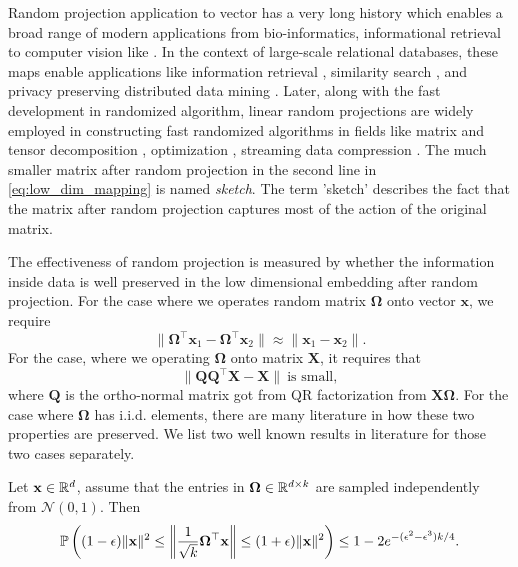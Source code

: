 Random projection application to vector has a very long history which enables a broad range of modern applications from bio-informatics, informational retrieval to computer vision like \citep{wright2009robust,buhler2002finding,allen2014sparse,bingham2001random,fradkin2003experiments, halko2011finding, wang2012semi, jegou2008hamming}. In the context of large-scale relational databases, these maps enable
applications like information retrieval \citep{papadimitriou2000latent},
similarity search \citep{sahin2005prism,kaski1998dimensionality},
and privacy preserving distributed data mining \citep{liu2006random}. 
Later, along with the fast development in randomized algorithm, linear random projections are widely employed in constructing fast randomized algorithms in fields like matrix and tensor decomposition \citep{woolfe2008fast, tropp2017practical}, optimization \citep{yurtsever2017sketchy}, streaming data compression \citep{Tropp2019-SketchingScientificSimulation, sun2019low}. The much smaller matrix after random projection in the second line in \eqref{eq:low_dim_mapping} is named \emph{sketch}.  
The term 'sketch' describes the fact that the matrix after random projection captures most of the action of the original matrix.  \par 
The effectiveness of random projection is measured by whether the information inside data is well preserved in the low dimensional embedding after random projection. For the case where we operates random matrix $\mathbf{\Omega}$ onto vector $\mathbf{x}$, we require 
\begin{equation}
\|\mathbf{\Omega}^\top\mathbf{x}_1 - \mathbf{\Omega}^\top\mathbf{x}_2\| \approx 
\|\mathbf{x}_1 -\mathbf{x}_2\|.
\end{equation}
For the case, where we operating $\mathbf{\Omega}$ onto matrix $\mathbf{X}$, it requires that
\begin{equation}
\|\mathbf{QQ}^\top \mathbf{X} - \mathbf{X}\| ~ \text{is small}, 
\end{equation}
where $\mathbf{Q}$ is the ortho-normal matrix got from QR factorization from $\mathbf{X\Omega}$.
For the case where $\mathbf{\Omega}$ has i.i.d. elements, there are many literature in how these two properties are preserved. We list two well known results in literature for those two cases separately.  
\begin{lem}
	\label{lem:gauss-rp-vector}
	Let $\mathbf{x} \in \mathbb{R}^d$, assume that the entries in $\mathbf{\Omega}\in \mathbb{R}^{d\times k}$ are sampled independently from $\mathcal{N}(0, 1)$. Then
	\begin{equation}
	\label{eq:gauss_random_projection}
	\mathbb{P}\left((1-\epsilon)\|\mathbf{x}\|^2 \le \left\|\frac{1}{\sqrt{k}} \mathbf{\Omega}^\top \mathbf{x}\right\|\le (1+\epsilon)\|\mathbf{x}\|^2\right)\le 1 - 2e^{-(\epsilon^2-\epsilon^3)k/4}.
	\end{equation}
\end{lem}


